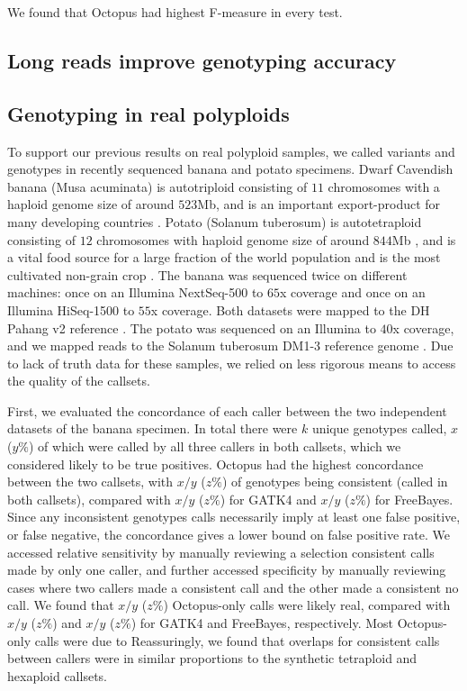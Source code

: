 \documentclass[notitlepage, twocolumn, 10pt]{article}
\begin{document}
We found that Octopus had highest F-measure in every test. 

\subsection*{Long reads improve genotyping accuracy}



\subsection*{Genotyping in real polyploids}

To support our previous results on real polyploid samples, we called variants and genotypes in recently sequenced banana \cite{RN670} and potato \cite{RN673} specimens. Dwarf Cavendish banana (Musa acuminata) is autotriploid consisting of $11$ chromosomes with a haploid genome size of around $523$Mb, and is an important export-product for many developing countries \cite{RN671}. Potato (Solanum tuberosum) is autotetraploid consisting of $12$ chromosomes with haploid genome size of around $844$Mb \cite{RN668}, and is a vital food source for a large fraction of the world population and is the most cultivated non-grain crop \cite{RN668}. The banana was sequenced twice on different machines: once on an Illumina NextSeq-500 to $65$x coverage and once on an Illumina HiSeq-1500 to $55$x coverage. Both datasets were mapped to the DH Pahang v2 reference \cite{RN670}. The potato was sequenced on an Illumina to $40$x coverage, and we mapped reads to the Solanum tuberosum DM1-3 reference genome \cite{RN672}. Due to lack of truth data for these samples, we relied on less rigorous means to access the quality of the callsets.

First, we evaluated the concordance of each caller between the two independent datasets of the banana specimen. In total there were $k$ unique genotypes called, $x$ ($y\%$) of which were called by all three callers in both callsets, which we considered likely to be true positives. Octopus had the highest concordance between the two callsets, with $x/y$ ($z\%$) of genotypes being consistent (called in both callsets), compared with $x/y$ ($z\%$) for GATK4 and $x/y$ ($z\%$) for FreeBayes. Since any inconsistent genotypes calls necessarily imply at least one false positive, or false negative, the concordance gives a lower bound on false positive rate. We accessed relative sensitivity by manually reviewing a selection consistent calls made by only one caller, and further accessed specificity by manually reviewing cases where two callers made a consistent call and the other made a consistent no call. We found that $x/y$ ($z\%$) Octopus-only calls were likely real, compared with $x/y$ ($z\%$) and $x/y$ ($z\%$) for GATK4 and FreeBayes, respectively. Most Octopus-only calls were due to  Reassuringly, we found that overlaps for consistent calls between callers were in similar proportions to the synthetic tetraploid and hexaploid callsets.
\end{document}
